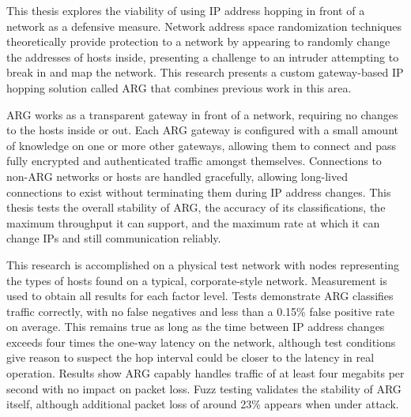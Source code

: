 \par This thesis explores the viability of using \ac{IP} address hopping in front of a network as a defensive measure. Network address space randomization techniques theoretically provide protection to a network by appearing to randomly change the addresses of hosts inside, presenting a challenge to an intruder attempting to break in and map the network. This research presents a custom gateway-based \ac{IP} hopping solution called \ac{ARG} that combines previous work in this area.

\par \ac{ARG} works as a transparent gateway in front of a network, requiring no changes to the hosts inside or out. Each \ac{ARG} gateway is configured with a small amount of knowledge on one or more other gateways, allowing them to connect and pass fully encrypted and authenticated traffic amongst themselves. Connections to non-\ac{ARG} networks or hosts are handled gracefully, allowing long-lived connections to exist without terminating them during \ac{IP} address changes. This thesis tests the overall stability of \ac{ARG}, the accuracy of its classifications, the maximum throughput it can support, and the maximum rate at which it can change \acp{IP} and still communication reliably.

\par This research is accomplished on a physical test network with nodes representing the types of hosts found on a typical, corporate-style network. Measurement is used to obtain all results for each factor level. Tests demonstrate \ac{ARG} classifies traffic correctly, with no false negatives and less than a 0.15\% false positive rate on average. This remains true as long as the time between \ac{IP} address changes exceeds four times the one-way latency on the network, although test conditions give reason to suspect the hop interval could be closer to the latency in real operation. Results show \ac{ARG} capably handles traffic of at least four megabits per second with no impact on packet loss. Fuzz testing validates the stability of \ac{ARG} itself, although additional packet loss of around 23\% appears when under attack.

\acresetall


